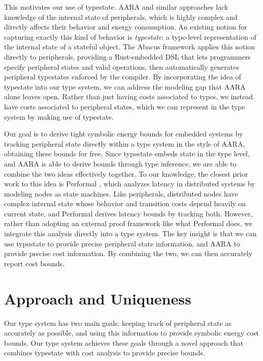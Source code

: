 \documentclass[sigconf, nonacm, screen]{acmart}
\begin{document}
This motivates our use of typestate. AARA and similar approaches lack knowledge of the internal state of peripherals, which is highly complex and directly affects their behavior and energy consumption. An existing notion for capturing exactly this kind of behavior is \textit{typestate}: a type-level representation of the internal state of a stateful object. The Abacus framework \cite{abacus} applies this notion directly to peripherals, providing a Rust-embedded DSL that lets programmers specify peripheral states and valid operations, then automatically generates peripheral typestates enforced by the compiler. By incorporating the idea of typestate into our type system, we can address the modeling gap that AARA alone leaves open. Rather than just having costs associated to types, we instead have costs associated to peripheral states, which we can represent in the type system by making use of typestate.

Our goal is to derive tight symbolic energy bounds for embedded systems by tracking peripheral state directly within a type system in the style of AARA, obtaining these bounds for free. Since typestate embeds state in the type level, and AARA is able to derive bounds through type inference, we are able to combine the two ideas effectively together. To our knowledge, the closest prior work to this idea is Performal \cite{performal}, which analyzes latency in distributed systems by modeling nodes as state machines. Like peripherals, distributed nodes have complex internal state whose behavior and transition costs depend heavily on current state, and Performal derives latency bounds by tracking both. However, rather than adopting an external proof framework like what Performal does, we integrate this analysis directly into a type system. The key insight is that we can use typestate to provide precise peripheral state information, and AARA to provide precise cost information. By combining the two, we can then accurately report cost bounds. 

\section{Approach and Uniqueness}

Our type system has two main goals: keeping track of peripheral state as accurately as possible, and using this information to provide symbolic energy cost bounds. Our type system achieves these goals through a novel approach that combines typestate with cost analysis to provide precise bounds. 
\end{document}
